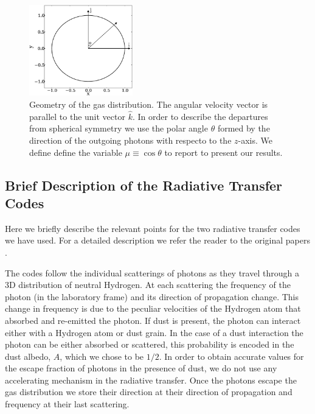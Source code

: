 \documentclass{emulateapj}
\newcommand{\ly}{{\ifmmode{{\rm Ly}\alpha~}\else{Ly$\alpha$~}\fi}}
\begin{document}
\begin{figure}
\begin{center}
  \includegraphics[width=0.4\textwidth]{f8.eps}
\end{center}
\caption{Geometry of the gas distribution. The angular velocity vector
  is parallel to the unit vector $\hat{k}$. In order to describe the
  departures from spherical symmetry we use the polar angle $\theta$
  formed by the direction of the outgoing photons with respecto to the
  $z$-axis. We define define the variable $\mu\equiv\cos\theta$ to
  report to present our results.
    \label{fig:geometry}}  
\end{figure}



\subsection{Brief Description of the Radiative Transfer Codes}

Here we briefly describe the relevant points for the two radiative
transfer codes we have used. For a detailed description we refer the
reader to the original papers \cite{CLARA,DijkstraKramer}.

The codes follow the individual scatterings of \ly photons as they
travel through a 3D distribution of neutral Hydrogen. At each
scattering the frequency of the photon (in the laboratory frame) and
its direction of propagation change. This change in frequency is due
to the peculiar velocities of the Hydrogen atom that absorbed and
re-emitted the photon. If dust is present, the photon can interact
either with a Hydrogen atom or dust grain. In the case of a dust
interaction the photon can be either absorbed or scattered, this
probability is encoded in the dust albedo, $A$, which we chose to be
$1/2$. In order to obtain accurate values for the escape fraction of
photons in the presence of dust, we do not use any accelerating
mechanism in the radiative transfer. Once the photons escape the gas
distribution we store their direction at their direction of
propagation and frequency at their last scattering.
\end{document}
